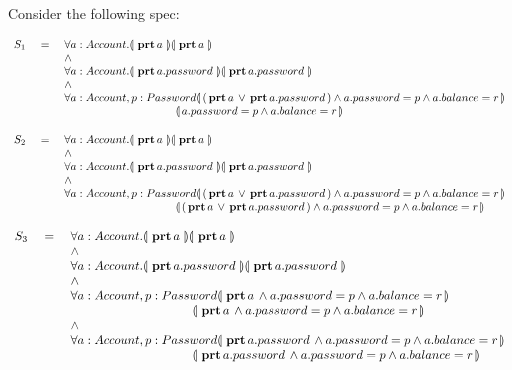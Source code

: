 \begin{example}
Consider the following spec:

$\begin{array}{lcl}
S_1& \ = \ &  \TwoStatesQ {a: Account}{ \inside {a} } {  \inside {a}  }\\
& & \wedge \\
& &  \TwoStatesQ {a: Account}{ \inside {a.password} } {  \inside {a.password}  }\\
& & \wedge\\
& & \forall {a: Account, p: Password}\FirstState{ (\inside {a}\vee\inside {a.password}) \wedge a.password=p \wedge a.balance=r  } \\
& & \strut \hspace{3.5cm} 
                     \SecondState {  a.password=p \wedge a.balance=r   }
\\
\end{array}
$

$\begin{array}{lcl}
S_2& \ = \ &  \TwoStatesQ {a: Account}{ \inside {a} } {  \inside {a}  }\\
& & \wedge \\
& &  \TwoStatesQ {a: Account}{ \inside {a.password} } {  \inside {a.password}  }\\
& & \wedge\\
& & \forall {a: Account, p: Password}\FirstState{ (\inside {a}\vee\inside {a.password}) \wedge a.password=p \wedge a.balance=r  }\\
& & \strut \hspace{3.5cm} 
                     \SecondState{ (\inside {a}\vee\inside {a.password}) \wedge a.password=p \wedge a.balance=r  }
\\
\end{array}
$

$\begin{array}{lcl}
S_3& \ = \ &  \TwoStatesQ {a: Account}{ \inside {a} } {  \inside {a}  }\\
& & \wedge \\
& &  \TwoStatesQ {a: Account}{ \inside {a.password} } {  \inside {a.password}  }\\
& & \wedge\\
& & \forall {a: Account, p: Password}\FirstState{ \inside {a}  \wedge a.password=p \wedge a.balance=r  } \\
& & \strut \hspace{3.45cm} 
                     \SecondState {  \inside {a}  \wedge a.password=p \wedge a.balance=r   }
                     \\
                     & & \wedge\\
& & \forall {a: Account, p: Password}\FirstState{   \inside {a.password} \wedge a.password=p \wedge a.balance=r  } \\
& & \strut \hspace{3.45cm} 
                     \SecondState { \inside {a.password}  \wedge a.password=p \wedge a.balance=r  }
\end{array}
$

\end{example}

